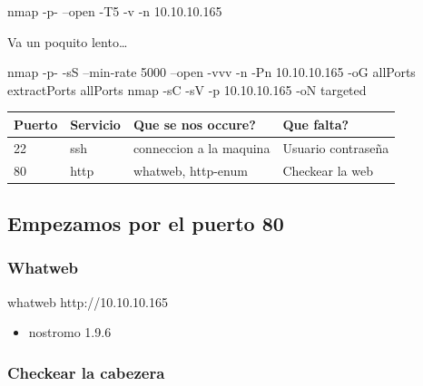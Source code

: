 \documentclass{assets/ipesethesis}
\newenvironment{Shaded}{\begin{snugshade}}{\end{snugshade}}
\newcommand{\ExtensionTok}[1]{#1}
\newcommand{\FunctionTok}[1]{\textcolor[rgb]{0.00,0.00,0.00}{#1}}
\newcommand{\NormalTok}[1]{#1}
\providecommand{\tightlist}{%
  \setlength{\itemsep}{0pt}\setlength{\parskip}{0pt}}
\begin{document}
\begin{Shaded}
\begin{Highlighting}[]
\FunctionTok{nmap}\NormalTok{ -p- --open -T5 -v -n 10.10.10.165}
\end{Highlighting}
\end{Shaded}

Va un poquito lento\ldots{}

\begin{Shaded}
\begin{Highlighting}[]
\FunctionTok{nmap}\NormalTok{ -p- -sS --min-rate 5000 --open -vvv -n -Pn 10.10.10.165 -oG allPorts}
\ExtensionTok{extractPorts}\NormalTok{ allPorts}
\FunctionTok{nmap}\NormalTok{ -sC -sV -p 10.10.10.165 -oN targeted}
\end{Highlighting}
\end{Shaded}

\begin{longtable}[]{@{}llll@{}}
\toprule
Puerto & Servicio & Que se nos occure? & Que falta?\tabularnewline
\midrule
\endhead
22 & ssh & conneccion a la maquina & Usuario contraseña\tabularnewline
80 & http & whatweb, http-enum & Checkear la web\tabularnewline
\bottomrule
\end{longtable}

\hypertarget{empezamos-por-el-puerto-80-1}{%
\subsection*{Empezamos por el puerto 80}\label{empezamos-por-el-puerto-80-1}}

\hypertarget{whatweb-1}{%
\subsubsection*{Whatweb}\label{whatweb-1}}

\begin{Shaded}
\begin{Highlighting}[]
\ExtensionTok{whatweb}\NormalTok{ http://10.10.10.165}
\end{Highlighting}
\end{Shaded}

\begin{itemize}
\tightlist
\item
  nostromo 1.9.6
\end{itemize}

\hypertarget{checkear-la-cabezera}{%
\subsubsection*{Checkear la cabezera}\label{checkear-la-cabezera}}
\end{document}
